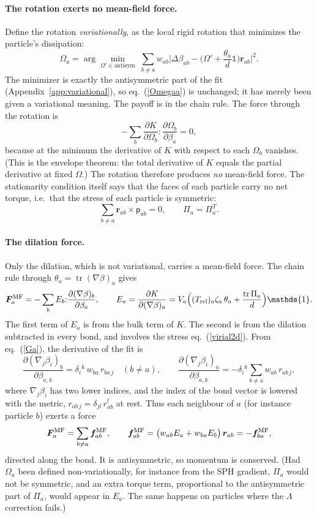 \documentclass[11pt,aps,preprint,nofootinbib,superscriptaddress,tightenlines]{revtex4-2}
\def\st{\begin{equation}}
\def\stp{\end{equation}}
\def\Eq#1{eq.~(\ref{#1})}
\providecommand{\tr}{\operatorname{tr}}
\newcommand{\one}{\mathds{1}}
\newcommand{\pf}{\bm{\mathsf p}}
\let\oldparagraph\paragraph
\renewcommand{\paragraph}{\par\bigskip\oldparagraph}
\begin{document}
\paragraph{The rotation exerts no mean-field force.}  Define the rotation
\emph{variationally}, as the local rigid rotation that minimizes the
particle's dissipation:
\st
\Omega_a=\arg\min_{\Omega'\in\text{antisym}}\;\sum_{b\neq a}w_{ab}
\Big|\Delta\beta_{ab}-\Big(\Omega'+\frac{\theta_a}{d}\one\Big)\bm r_{ab}\Big|^2 .
\label{Omegavar}
\stp
The minimizer is exactly the antisymmetric part of the fit
(Appendix~\ref{app:variational}), so \Eq{Omegaa} is unchanged; it has merely
been given a variational meaning.  The payoff is in the chain rule.  The
force through the rotation is
\st
-\sum_b\frac{\partial K}{\partial\Omega_b}{:}\frac{\partial\Omega_b}{\partial\beta_a}=0 ,
\stp
because at the minimum the derivative of $K$ with respect to each $\Omega_b$
vanishes.  (This is the envelope theorem: the total derivative of $K$ equals
the partial derivative at fixed $\Omega$.)  The rotation therefore produces
\emph{no} mean-field force.  The stationarity condition itself says that the
faces of each particle carry no net torque, i.e.\ that the stress of each
particle is symmetric:
\st
\sum_{b\neq a}\bm r_{ab}\times\pf_{ab}=0,\qquad \Pi_a=\Pi_a^T .
\stp

\paragraph{The dilation force.}  Only the dilation, which is not variational,
carries a mean-field force.  The chain rule through $\theta_a=\tr(\nabla\beta)_a$ gives
\st
\bm F^{\rm MF}_a=-\sum_bE_b{:}\frac{\partial (\nabla\beta)_b}{\partial\beta_a},\qquad
E_a=\frac{\partial K}{\partial (\nabla\beta)_a}=V_a\Big((T_{\rm rel})_a\zeta_a\,\theta_a+\frac{\tr\Pi_a}{d}\Big)\one .
\label{fMF}
\stp
The first term of $E_a$ is from the bulk term of $K$.  The second is from
the dilation subtracted in every bond, and involves the stress \Eq{virial2d}.  From \Eq{Ga}, the derivative of the fit is
\st
\frac{\partial (\nabla_j\beta_i)_b}{\partial\beta_{a,k}}=\delta_i{}^k\,w_{ba}\,r_{ba\,j}\quad(b\neq a),\qquad
\frac{\partial (\nabla_j\beta_i)_a}{\partial\beta_{a,k}}=-\delta_i{}^k\sum_{b\neq a}w_{ab}\,r_{ab\,j},
\stp
where $\nabla_j\beta_i$ has two lower indices, and the index of the bond
vector is lowered with the metric, $r_{ab\,j}=\delta_{jl}\,r^l_{ab}$ at rest.
Thus each neighbour of $a$ (for instance particle $b$) exerts a force
\st
\bm F^{\rm MF}_a=\sum_{b\neq a}\bm f^{\rm MF}_{ab},\qquad
\bm f^{\rm MF}_{ab}=\big(w_{ab}E_a+w_{ba}E_b\big)\,\bm r_{ab}=-\bm f^{\rm MF}_{ba},
\stp
directed along the bond.  It is antisymmetric, so momentum is conserved.  (Had
$\Omega_a$ been defined non-variationally, for instance from the SPH gradient,
$\Pi_a$ would not be symmetric, and an extra torque term, proportional to the
antisymmetric part of $\Pi_a$, would appear in $E_a$.  The same happens on
particles where the $\Lambda$ correction fails.)
\end{document}
